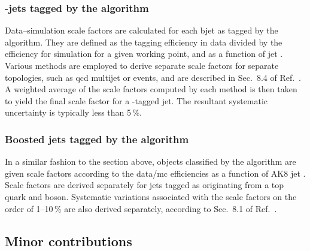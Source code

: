 

\subsubsection{\texorpdfstring{\Pbottom-jets}{b-jets} tagged by the \texorpdfstring{\deepcsv}{DeepCSV} algorithm}
\label{subsubsec:htoinv_btagging_sfs}

Data--simulation scale factors are calculated for each \gls{bjet} as tagged by the \deepcsv algorithm. They are defined as the tagging efficiency in data divided by the efficiency for simulation for a given working point, and as a function of \gls{jet} \pt. Various methods are employed to derive separate scale factors for separate topologies, such as \acrshort{qcd} multijet or \ttbar events, and are described in Sec.~8.4 of Ref.~. A weighted average of the scale factors computed by each method is then taken to yield the final scale factor for a \Pbottom-tagged \gls{jet}. The resultant systematic uncertainty is typically less than 5\,\%.





\subsubsection{Boosted jets tagged by the \texorpdfstring{\deepakeight}{DeepAK8} algorithm}
\label{subsubsec:htoinv_deepak8_sfs}

In a similar fashion to the section above, objects classified by the \deepakeight algorithm are given scale factors according to the data/\acrshort{mc} efficiencies as a function of AK8 \gls{jet} \pt. Scale factors are derived separately for \glspl{jet} tagged as originating from a top quark and \PVec boson. Systematic variations associated with the scale factors on the order of 1--10\,\% are also derived separately, according to Sec.~8.1 of Ref.~.




\subsection{Minor contributions}
\label{subsec:htoinv_minor_weights_systs}

